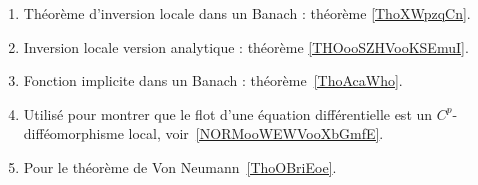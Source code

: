 	\label{THEMEooInversionLocale}
\begin{enumerate}
	\item
	      Théorème d'inversion locale dans un Banach : théorème \ref{ThoXWpzqCn}.
	\item
	      Inversion locale version analytique : théorème \ref{THOooSZHVooKSEmuI}.
	\item
	      Fonction implicite dans un Banach : théorème~\ref{ThoAcaWho}.
	\item
	      Utilisé pour montrer que le flot d'une équation différentielle est un \( C^p\)-difféomorphisme local, voir~\ref{NORMooWEWVooXbGmfE}. %
	\item
	      Pour le théorème de Von Neumann~\ref{ThoOBriEoe}.
\end{enumerate}
